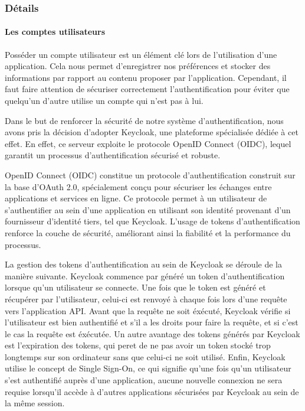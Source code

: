 \subsubsection{Détails}

\paragraph{Les comptes utilisateurs}

Posséder un compte utilisateur est un élément clé lors de l'utilisation d'une application. Cela nous permet d'enregistrer nos préférences et stocker des informations par rapport au contenu proposer par l'application. Cependant, il faut faire attention de sécuriser correctement l'authentification pour éviter que quelqu'un d'autre utilise un compte qui n'est pas à lui.

Dans le but de renforcer la sécurité de notre système d'authentification, nous avons pris la décision d'adopter Keycloak, une plateforme spécialisée dédiée à cet effet. En effet, ce serveur exploite le protocole OpenID Connect (OIDC), lequel garantit un processus d'authentification sécurisé et robuste.

OpenID Connect (OIDC) constitue un protocole d'authentification construit sur la base d'OAuth 2.0, spécialement conçu pour sécuriser les échanges entre applications et services en ligne. Ce protocole permet à un utilisateur de s'authentifier au sein d'une application en utilisant son identité provenant d'un fournisseur d'identité tiers, tel que Keycloak. L'usage de tokens d'authentification renforce la couche de sécurité, améliorant ainsi la fiabilité et la performance du processus.

La gestion des tokens d'authentification au sein de Keycloak se déroule de la manière suivante. Keycloak commence par généré un token d'authentification lorsque qu'un utilisateur se connecte. Une fois que le token est généré et récupérer par l'utilisateur, celui-ci est renvoyé à chaque fois lors d'une requête vers l'application API. Avant que la requête ne soit éxécuté, Keycloak vérifie si l'utilisateur est bien authentifié et s'il a les droits pour faire la requête, et si c'est le cas la requête est éxécutée. Un autre avantage des tokens générés par  Keycloak est l'expiration des tokens, qui peret de ne pas avoir un token stocké trop longtemps sur son ordinateur sans que celui-ci ne soit utilisé. Enfin, Keycloak utilise le concept de Single Sign-On, ce qui signifie qu'une fois qu'un utilisateur s'est authentifié auprès d'une application, aucune nouvelle connexion ne sera requise lorsqu'il accède à d'autres applications sécurisées par Keycloak au sein de la même session.

